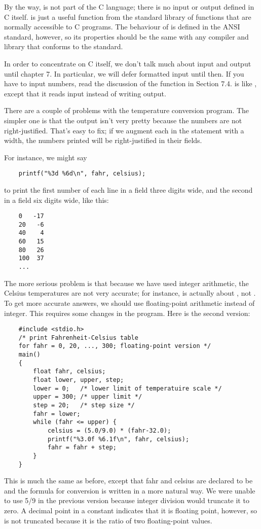 By the way,  is not part of the C language; there is no input or output defined in C itself.
 is just a useful function from the standard library of functions that are normally accessible to C programs.
The behaviour of  is defined in the ANSI standard, however, so its properties should be the same with any compiler and library that conforms to the standard.

In order to concentrate on C itself, we don't talk much about input and output until chapter 7.
In particular, we will defer formatted input until then.
If you have to input numbers, read the discussion of the function  in Section 7.4.  is like , except that it reads input instead of writing output.

There are a couple of problems with the temperature conversion program.
The simpler one is that the output isn't very pretty because the numbers are not right-justified.
That's easy to fix; if we augment each  in the  statement with a width, the numbers printed will be right-justified in their fields.

For instance, we might say
\begin{lstlisting}
	printf("%3d %6d\n", fahr, celsius);
\end{lstlisting}
to print the first number of each line in a field three digits wide, and the second in a field six digits wide, like this:
\begin{lstlisting}
	0 	-17
	20 	 -6
	40    4
	60   15
	80   26
	100  37
	...
\end{lstlisting}

The more serious problem is that because we have used integer arithmetic, the Celsius temperatures are not very accurate; for instance,  is actually about , not .
To get more accurate answers, we should use floating-point arithmetic instead of integer.
This requires some changes in the program. Here is the second version:
\begin{lstlisting}
	#include <stdio.h>
	/* print Fahrenheit-Celsius table
	for fahr = 0, 20, ..., 300; floating-point version */
	main()
	{
		float fahr, celsius;
		float lower, upper, step;
		lower = 0;   /* lower limit of temperatuire scale */
		upper = 300; /* upper limit */
		step = 20; 	 /* step size */
		fahr = lower;
		while (fahr <= upper) {
			celsius = (5.0/9.0) * (fahr-32.0);
			printf("%3.0f %6.1f\n", fahr, celsius);
			fahr = fahr + step;
		}
	}
\end{lstlisting}
This is much the same as before, except that fahr and celsius are declared to be  and the formula for conversion is written in a more natural way.
We were unable to use 5/9 in the previous version because integer division would truncate it to zero.
A decimal point in a constant indicates that it is floating point, however, so  is not truncated because it is the ratio of two floating-point values.

